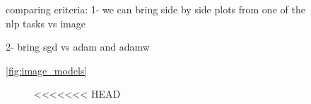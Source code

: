 \begin{figure}[htb!]
{comparing criteria:
1- we can bring side by side plots from one of the nlp tasks vs image

2- bring sgd vs adam and adamw


\autoref{fig:image_models}
\begin{figure}[t]
    \centering
    <<<<<<< HEAD
\end{figure}}
\end{figure}

